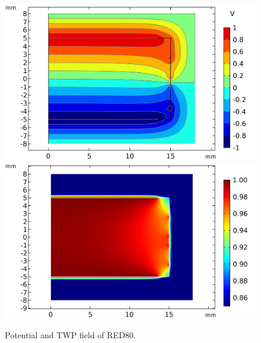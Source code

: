 \begin{figure}
\centering
\includegraphics[scale=0.5]{Figures/ElectrodesExperimental/potential_red80.png}
\includegraphics[scale=0.5]{Figures/ElectrodesExperimental/twp_red80.png}
\caption{Potential and TWP field of RED80.}
\label{fig:efield-red80}
\end{figure}

